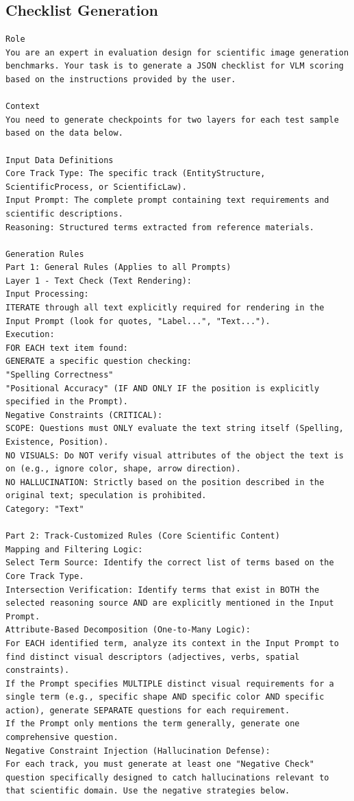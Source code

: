 \documentclass[runningheads]{llncs}
\begin{document}
\subsection{Checklist Generation}
\begin{tcolorbox}[colback=white, colframe=blue!50!black, boxrule=1pt, arc=2mm, breakable]
\scriptsize
\begin{lstlisting}[breaklines=true, breakindent=0pt, basicstyle=\scriptsize\ttfamily, columns=fullflexible]
Role
You are an expert in evaluation design for scientific image generation benchmarks. Your task is to generate a JSON checklist for VLM scoring based on the instructions provided by the user.

Context
You need to generate checkpoints for two layers for each test sample based on the data below.

Input Data Definitions
Core Track Type: The specific track (EntityStructure, ScientificProcess, or ScientificLaw).
Input Prompt: The complete prompt containing text requirements and scientific descriptions.
Reasoning: Structured terms extracted from reference materials.

Generation Rules
Part 1: General Rules (Applies to all Prompts)
Layer 1 - Text Check (Text Rendering):
Input Processing:
ITERATE through all text explicitly required for rendering in the Input Prompt (look for quotes, "Label...", "Text...").
Execution:
FOR EACH text item found:
GENERATE a specific question checking:
"Spelling Correctness"
"Positional Accuracy" (IF AND ONLY IF the position is explicitly specified in the Prompt).
Negative Constraints (CRITICAL):
SCOPE: Questions must ONLY evaluate the text string itself (Spelling, Existence, Position).
NO VISUALS: Do NOT verify visual attributes of the object the text is on (e.g., ignore color, shape, arrow direction).
NO HALLUCINATION: Strictly based on the position described in the original text; speculation is prohibited. 
Category: "Text"

Part 2: Track-Customized Rules (Core Scientific Content)
Mapping and Filtering Logic:
Select Term Source: Identify the correct list of terms based on the Core Track Type.
Intersection Verification: Identify terms that exist in BOTH the selected reasoning source AND are explicitly mentioned in the Input Prompt.
Attribute-Based Decomposition (One-to-Many Logic):
For EACH identified term, analyze its context in the Input Prompt to find distinct visual descriptors (adjectives, verbs, spatial constraints).
If the Prompt specifies MULTIPLE distinct visual requirements for a single term (e.g., specific shape AND specific color AND specific action), generate SEPARATE questions for each requirement.
If the Prompt only mentions the term generally, generate one comprehensive question.
Negative Constraint Injection (Hallucination Defense):
For each track, you must generate at least one "Negative Check" question specifically designed to catch hallucinations relevant to that scientific domain. Use the negative strategies below.


\end{lstlisting}
\end{tcolorbox}
\end{document}
